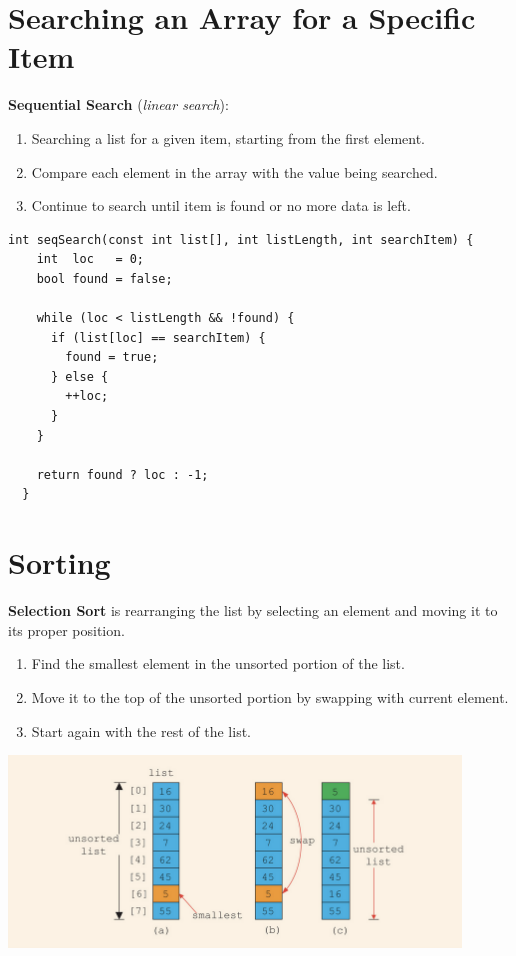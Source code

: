 \documentclass{article}
\begin{document}
\section{Searching an Array for a Specific Item}
\textbf{Sequential Search} (\textit{linear search}):
\begin{enumerate}
  \item Searching a list for a given item, starting from the first element.
  \item Compare each element in the array with the value being searched.
  \item Continue to search until item is found or no more data is left. 
\end{enumerate}

\begin{lstlisting}[caption={Simple Array Search}]
  int seqSearch(const int list[], int listLength, int searchItem) {
    int  loc   = 0;
    bool found = false;

    while (loc < listLength && !found) {
      if (list[loc] == searchItem) {
        found = true;
      } else {
        ++loc;
      }
    }

    return found ? loc : -1;
  }
\end{lstlisting}

\section{Sorting}
\textbf{Selection Sort} is rearranging the list by selecting an element and
moving it to its proper position.

\begin{enumerate}
  \item Find the smallest element in the unsorted portion of the list.
  \item Move it to the top of the unsorted portion by swapping with current
    element.
  \item Start again with the rest of the list.
\end{enumerate}

\begin{center}
    \includegraphics[width=0.9\textwidth]{1D-sel-sort.png}
\end{center}
\end{document}

